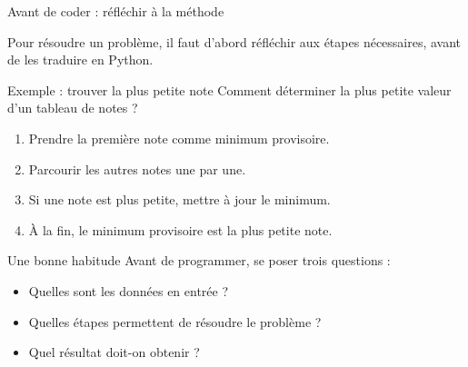\documentclass[10pt]{beamer}
\begin{document}
\begin{frame}{Avant de coder : réfléchir à la méthode}

Pour résoudre un problème, il faut d'abord réfléchir
aux étapes nécessaires, avant de les traduire en Python.

\begin{exampleblock}{Exemple : trouver la plus petite note}
Comment déterminer la plus petite valeur d'un tableau de notes ?

\begin{enumerate}
    \item Prendre la première note comme minimum provisoire.
    \item Parcourir les autres notes une par une.
    \item Si une note est plus petite, mettre à jour le minimum.
    \item À la fin, le minimum provisoire est la plus petite note.
\end{enumerate}
\end{exampleblock}

\pause

\begin{alertblock}{Une bonne habitude}
Avant de programmer, se poser trois questions :
\begin{itemize}
    \item Quelles sont les données en entrée ?
    \item Quelles étapes permettent de résoudre le problème ?
    \item Quel résultat doit-on obtenir ?
\end{itemize}
\end{alertblock}

\end{frame}
\end{document}
